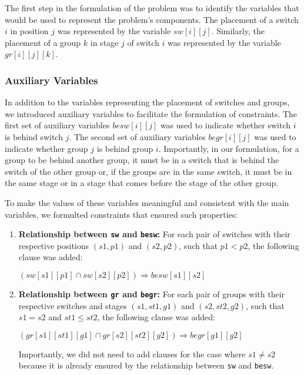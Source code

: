 The first step in the formulation of the problem was to identify the variables that would be used to represent the problem's components. The placement of a switch \(i\) in position \(j\) was represented by the variable \(sw[i][j]\). Similarly, the placement of a group \(k\) in stage \(j\) of switch \(i\) was represented by the variable \(gr[i][j][k]\).

\subsubsection{Auxiliary Variables}

In addition to the variables representing the placement of switches and groups, we introduced auxiliary variables to facilitate the formulation of constraints. The first set of auxiliary variables \(besw[i][j]\) was used to indicate whether switch \(i\) is behind switch \(j\). The second set of auxiliary variables \(begr[i][j]\) was used to indicate whether group \(j\) is behind group \(i\). Importantly, in our formulation, for a group to be behind another group, it must be in a switch that is behind the switch of the other group or, if the groups are in the same switch, it must be in the same stage or in a stage that comes before the stage of the other group.

To make the values of these variables meaningful and consistent with the main variables, we formulted constraints that ensured such properties:

\begin{enumerate}
    \item \textbf{Relationship between \texttt{sw} and \texttt{besw}:} For each pair of switches with their respective positions \((s1, p1)\) and \((s2, p2)\), such that \(p1 < p2\), the following clause was added:
    \begin{center}
        \((sw[s1][p1] \cap sw[s2][p2]) \Rightarrow besw[s1][s2]\)
    \end{center}

    \item \textbf{Relationship between \texttt{gr} and \texttt{begr}:} For each pair of groups with their respective switches and stages \((s1, st1, g1)\) and \((s2, st2, g2)\), such that \(s1 = s2\) and \(st1 \leq st2\), the following clause was added:
    \begin{center}
        \((gr[s1][st1][g1] \cap gr[s2][st2][g2]) \Rightarrow begr[g1][g2]\)
    \end{center}
    Importantly, we did not need to add clauses for the case where \(s1 \neq s2\) because it is already ensured by the relationship between \texttt{sw} and \texttt{besw}.
\end{enumerate}

